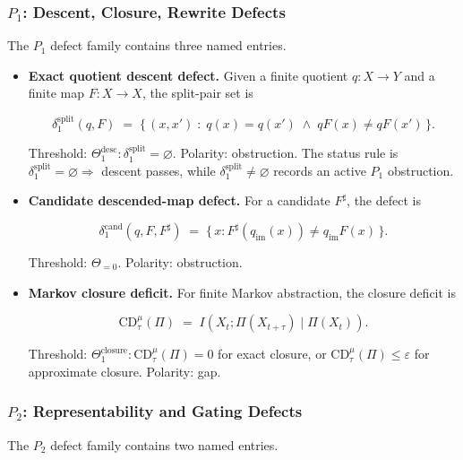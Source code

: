 \documentclass[11pt]{article}
\theoremstyle{definition}
\begin{document}
\subsubsection{\texorpdfstring{\(P_1\): Descent, Closure, Rewrite Defects}{P\_1: Descent, Closure, Rewrite Defects}}

The \(P_1\) defect family contains three named entries.

\begin{itemize}
\item
  \textbf{Exact quotient descent defect.} Given a finite quotient \(q:X\to Y\) and a finite map \(F:X\to X\), the split-pair set is

  \[
  \delta_1^{\mathrm{split}}(q,F)\;=\;\{\,(x,x')\;:\;q(x)=q(x')\;\wedge\;qF(x)\neq qF(x')\,\}.
  \]

  Threshold: \(\Theta_1^{\mathrm{desc}}:\delta_1^{\mathrm{split}}=\varnothing\). Polarity: obstruction. The status rule is \(\delta_1^{\mathrm{split}}=\varnothing\Rightarrow\) descent passes, while \(\delta_1^{\mathrm{split}}\neq\varnothing\) records an active \(P_1\) obstruction.
\item
  \textbf{Candidate descended-map defect.} For a candidate \(F^\sharp\), the defect is

  \[
  \delta_1^{\mathrm{cand}}(q,F,F^\sharp)\;=\;\{\,x:F^\sharp(q_{\mathrm{im}}(x))\neq q_{\mathrm{im}}F(x)\,\}.
  \]

  Threshold: \(\Theta_{=0}\). Polarity: obstruction.
\item
  \textbf{Markov closure deficit.} For finite Markov abstraction, the closure deficit is

  \[
  \mathrm{CD}_{\tau}^{\mu}(\Pi)\;=\;I(X_t;\Pi(X_{t+\tau})\mid\Pi(X_t)).
  \]

  Threshold: \(\Theta_1^{\mathrm{closure}}:\mathrm{CD}_{\tau}^{\mu}(\Pi)=0\) for exact closure, or \(\mathrm{CD}_{\tau}^{\mu}(\Pi)\le\varepsilon\) for approximate closure. Polarity: gap.
\end{itemize}

\subsubsection{\texorpdfstring{\(P_2\): Representability and Gating Defects}{P\_2: Representability and Gating Defects}}

The \(P_2\) defect family contains two named entries.
\end{document}

